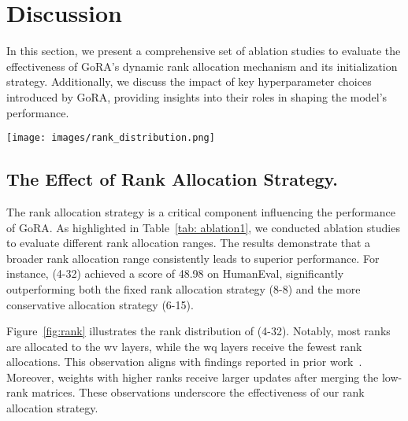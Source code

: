 \section{Discussion}
\label{ablations}
In this section, we present a comprehensive set of ablation studies to evaluate the effectiveness of GoRA's dynamic rank allocation mechanism and its initialization strategy. Additionally, we discuss the impact of key hyperparameter choices introduced by GoRA, providing insights into their roles in shaping the model's performance.

\begin{figure*}[htp!] 
    \centering 
    \texttt{[image: images/rank\_distribution.png]}
    \caption{(a) Result rank distribution of fine-tuning Llama-3.1-8B-Base on the MetaMathQA-100K dataset using GoRA;(b) Difference values between GoRA and LoRA in directional updates of full-rank weights after merging;(c) Difference values between GoRA and LoRA in magnitude updates of full-rank weights after merging. Data points presented for every two layers.}
    \label{fig:rank}
\end{figure*}


\subsection{The Effect of Rank Allocation Strategy.}

The rank allocation strategy is a critical component influencing the performance of GoRA. As highlighted in Table~\ref{tab: ablation1}, we conducted ablation studies to evaluate different rank allocation ranges. The results demonstrate that a broader rank allocation range consistently leads to superior performance. For instance, (4-32) achieved a score of 48.98 on HumanEval, significantly outperforming both the fixed rank allocation strategy (8-8) and the more conservative allocation strategy (6-15). 

Figure~\ref{fig:rank} illustrates the rank distribution of (4-32). Notably, most ranks are allocated to the wv layers, while the wq layers receive the fewest rank allocations. This observation aligns with findings reported in prior work~\citep{hu2021lora}. Moreover, weights with higher ranks receive larger updates after merging the low-rank matrices. These observations underscore the effectiveness of our rank allocation strategy.

